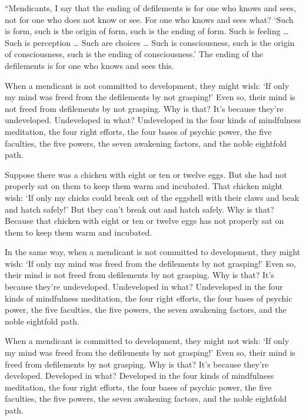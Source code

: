 \documentclass[12pt,openany]{book}%
\begin{document}
“Mendicants, I say that the ending of defilements is for one who knows and sees, not for one who does not know or see. For one who knows and sees what? ‘Such is form, such is the origin of form, such is the ending of form. Such is feeling … Such is perception … Such are choices … Such is consciousness, such is the origin of consciousness, such is the ending of consciousness.’ The ending of the defilements is for one who knows and sees this. 

When a mendicant is not committed to development, they might wish: ‘If only my mind was freed from the defilements by not grasping!’ Even so, their mind is not freed from defilements by not grasping. Why is that? It’s because they’re undeveloped. Undeveloped in what? Undeveloped in the four kinds of mindfulness meditation, the four right efforts, the four bases of psychic power, the five faculties, the five powers, the seven awakening factors, and the noble eightfold path. 

Suppose there was a chicken with eight or ten or twelve eggs. But she had not properly sat on them to keep them warm and incubated. That chicken might wish: ‘If only my chicks could break out of the eggshell with their claws and beak and hatch safely!’ But they can’t break out and hatch safely. Why is that? Because that chicken with eight or ten or twelve eggs has not properly sat on them to keep them warm and incubated. 

In the same way, when a mendicant is not committed to development, they might wish: ‘If only my mind was freed from the defilements by not grasping!’ Even so, their mind is not freed from defilements by not grasping. Why is that? It’s because they’re undeveloped. Undeveloped in what? Undeveloped in the four kinds of mindfulness meditation, the four right efforts, the four bases of psychic power, the five faculties, the five powers, the seven awakening factors, and the noble eightfold path. 

When a mendicant is committed to development, they might not wish: ‘If only my mind was freed from the defilements by not grasping!’ Even so, their mind is freed from defilements by not grasping. Why is that? It’s because they’re developed. Developed in what? Developed in the four kinds of mindfulness meditation, the four right efforts, the four bases of psychic power, the five faculties, the five powers, the seven awakening factors, and the noble eightfold path. 
\end{document}
